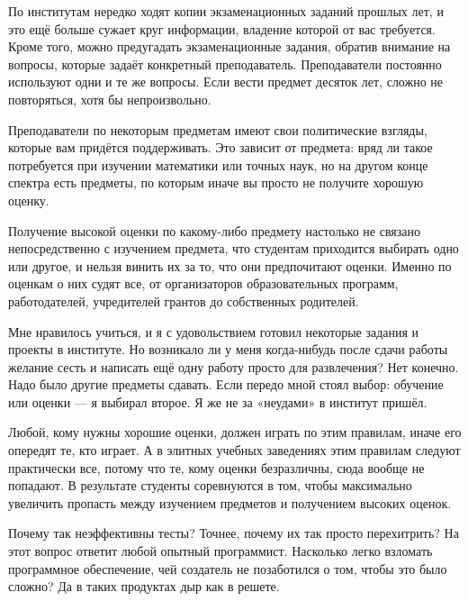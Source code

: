 \documentclass[ebook,12pt,oneside,openany]{memoir}
\begin{document}
По институтам нередко ходят копии экзаменационных заданий прошлых лет,
и это ещё больше сужает круг информации, владение которой от вас
требуется. Кроме того, можно предугадать экзаменационные задания,
обратив внимание на вопросы, которые задаёт конкретный преподаватель.
Преподаватели постоянно используют одни и те же вопросы. Если вести
предмет десяток лет, сложно не повторяться, хотя бы непроизвольно. \newline

Преподаватели по некоторым предметам имеют свои политические взгляды,
которые вам придётся поддерживать. Это зависит от предмета: вряд ли
такое потребуется при изучении математики или точных наук, но на
другом конце спектра есть предметы, по которым иначе вы просто не
получите хорошую оценку. \newline

Получение высокой оценки по какому-либо предмету настолько не связано
непосредственно с изучением предмета, что студентам приходится
выбирать одно или другое, и нельзя винить их за то, что они
предпочитают оценки. Именно по оценкам о них судят все, от
организаторов образовательных программ, работодателей, учредителей
грантов до собственных родителей. \newline

Мне нравилось учиться, и я с удовольствием готовил некоторые задания и
проекты в институте. Но возникало ли у меня когда-нибудь после сдачи
работы желание сесть и написать ещё одну работу просто для
развлечения? Нет конечно. Надо было другие предметы сдавать. Если
передо мной стоял выбор: обучение или оценки — я выбирал второе. Я же
не за «неудами» в институт пришёл. \newline

Любой, кому нужны хорошие оценки, должен играть по этим правилам,
иначе его опередят те, кто играет. А в элитных учебных заведениях этим
правилам следуют практически все, потому что те, кому оценки
безразличны, сюда вообще не попадают. В результате студенты
соревнуются в том, чтобы максимально увеличить пропасть между
изучением предметов и получением высоких оценок. \newline

Почему так неэффективны тесты? Точнее, почему их так просто
перехитрить? На этот вопрос ответит любой опытный программист.
Насколько легко взломать программное обеспечение, чей создатель не
позаботился о том, чтобы это было сложно? Да в таких продуктах дыр как
в решете. \newline
\end{document}
